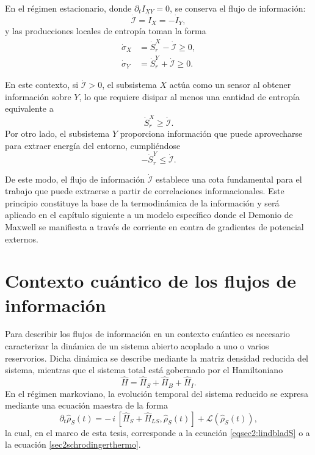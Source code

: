 En el régimen estacionario, donde \( \partial_t I_{XY} = 0 \), se conserva el flujo de información:
\[
\dot{\mathcal{I}} = \dot{I}_{X} = -\dot{I}_{Y},
\]
y las producciones locales de entropía toman la forma
\begin{align*}
    \dot{\sigma}_{X} & = \dot{S}_{r}^{X} - \dot{\mathcal{I}} \geq 0, \\
    \dot{\sigma}_{Y} & = \dot{S}_{r}^{Y} + \dot{\mathcal{I}} \geq 0.
\end{align*}

En este contexto, si \( \dot{\mathcal{I}} > 0 \), el subsistema \( X \) actúa como un sensor al obtener información sobre \( Y \), lo que requiere disipar al menos una cantidad de entropía equivalente a
\[
\dot{S}_{r}^{X} \geq \dot{\mathcal{I}}.
\]
Por otro lado, el subsistema \( Y \) proporciona información que puede aprovecharse para extraer energía del entorno, cumpliéndose
\[
-\dot{S}_{r}^{Y} \leq \dot{\mathcal{I}}.
\]

De este modo, el flujo de información \( \dot{\mathcal{I}} \) establece una cota fundamental para el trabajo que puede extraerse a partir de correlaciones informacionales. Este principio constituye la base de la termodinámica de la información y será aplicado en el capítulo siguiente a un modelo específico donde el Demonio de Maxwell se manifiesta a través de corriente en contra de gradientes de potencial externos.

\section{Contexto cuántico de los flujos de información}

Para describir los flujos de información en un contexto cuántico es necesario caracterizar la dinámica de un sistema abierto acoplado a uno o varios reservorios. Dicha dinámica se describe mediante la matriz densidad reducida del sistema, mientras que el sistema total está gobernado por el Hamiltoniano
\[
\hat{H}=\hat{H}_{S}+\hat{H}_{B}+\hat{H}_{I}.
\]
En el régimen markoviano, la evolución temporal del sistema reducido se expresa mediante una ecuación maestra de la forma
\begin{equation*}
    \partial_{t}\hat{\rho}_{S}(t)
    = -\,i\,[\hat{H}_{S}+\hat{H}_{LS},\hat{\rho}_{S}(t)]
      + \mathcal{L}(\hat{\rho}_{S}(t)),
\end{equation*}
la cual, en el marco de esta tesis, corresponde a la ecuación \eqref{eqsec2:lindbladS} o a la ecuación \eqref{sec2schrodingerthermo}.

